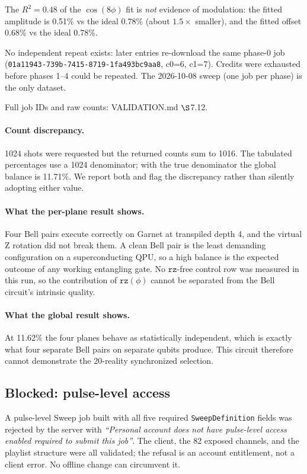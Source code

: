 \documentclass[11pt,a4paper]{article}
\begin{document}
The $R^2=0.48$ of the $\cos(8\phi)$ fit is \emph{not} evidence of modulation: the
fitted amplitude is 0.51\% vs the ideal 0.78\% (about $1.5\times$ smaller), and the
fitted offset 0.68\% vs the ideal 0.78\%.

No independent repeat exists: later entries re-download the same phase-0 job
(\texttt{01a11943-739b-7415-8719-1fa493bc9aa8}, c0=6, c1=7). Credits were exhausted
before phases 1--4 could be repeated. The 2026-10-08 sweep (one job per phase) is
the only dataset.

Full job IDs and raw counts: VALIDATION.md $\S$7.12.

\paragraph{Count discrepancy.} 1024 shots were requested but the returned
counts sum to 1016. The tabulated percentages use a 1024 denominator; with the
true denominator the global balance is 11.71\%. We report both and flag the
discrepancy rather than silently adopting either value.

\paragraph{What the per-plane result shows.} Four Bell pairs execute correctly
on Garnet at transpiled depth 4, and the virtual Z rotation did not break them.
A clean Bell pair is the least demanding configuration on a superconducting
QPU, so a high balance is the expected outcome of any working entangling gate.
No $\texttt{rz}$-free control row was measured in this run, so the contribution
of $\texttt{rz}(\phi)$ cannot be separated from the Bell circuit's intrinsic
quality.

\paragraph{What the global result shows.} At 11.62\% the four planes behave as
statistically independent, which is exactly what four separate Bell pairs on
separate qubits produce. This circuit therefore cannot demonstrate the
20-reality synchronized selection.

\subsection{Blocked: pulse-level access}

A pulse-level Sweep job built with all five required \texttt{SweepDefinition}
fields was rejected by the server with
\emph{``Personal account does not have pulse-level access enabled required to
submit this job''}. The client, the 82 exposed channels, and the playlist
structure were all validated; the refusal is an account entitlement, not a
client error. No offline change can circumvent it.
\end{document}
